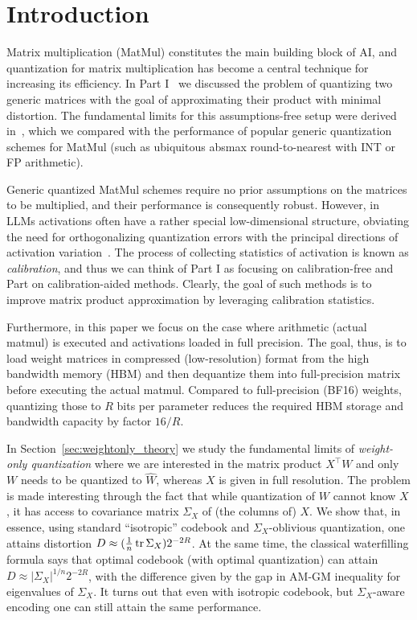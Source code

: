 \documentclass[journal]{IEEEtran}
\newcommand{\trace}{\mathop{\mathrm{tr}}}
\def\tr{\trace}
\begin{document}
\section{Introduction}

Matrix multiplication (MatMul) constitutes the main building block of
AI, and quantization for matrix multiplication has become a central technique for increasing its
efficiency. In Part I~\cite{OP26part1} we discussed the problem of quantizing two generic matrices
with the goal of approximating their product with minimal distortion. The fundamental limits for
this assumptions-free setup were derived in~\cite{ordentlich2024optimal}, which we compared with
the performance of popular generic quantization schemes for MatMul (such as ubiquitous absmax
round-to-nearest with INT or FP arithmetic).

Generic quantized MatMul schemes require no prior assumptions on the matrices to be multiplied,
and their performance is consequently robust. However, in LLMs activations often have a rather
special low-dimensional structure, obviating the need for orthogonalizing quantization errors with
the principal directions of activation variation~\cite{adaround,frantar2023optq}. The process of
collecting statistics of activation is known as \emph{calibration}, and thus we can think of Part
I as focusing on calibration-free and Part on calibration-aided methods. Clearly, the goal of such
methods is to improve matrix product approximation by leveraging calibration statistics.

Furthermore, in this paper we focus on the case where arithmetic (actual matmul) is executed and
activations loaded in
full precision. The goal, thus, is to load weight matrices in compressed (low-resolution) format
from the high bandwidth memory (HBM) and then dequantize them into full-precision matrix before
executing the actual matmul. 
Compared to full-precision (BF16) weights, quantizing those to $R$ bits per parameter reduces the required HBM storage and
bandwidth capacity by factor
$16/R$. %


In Section~\ref{sec:weightonly_theory} we study the fundamental limits of \emph{weight-only quantization} where we are interested in the
matrix product $X^\top W$ and only $W$ needs to be quantized to $\hat{W}$, whereas $X$ is given
in full resolution. The problem is made interesting through the fact that while quantization of
$W$ cannot know $X$, it has access to covariance matrix $\Sigma_X$ of (the columns of) $X$.
We show that, in essence, using standard ``isotropic'' codebook and $\Sigma_X$-oblivious
quantization, one attains distortion $D\approx
({1\over n} \tr \Sigma_X) 2^{-2R}$. At the same time, the classical waterfilling
formula says that optimal codebook (with optimal quantization) can attain $D\approx
 |\Sigma_X|^{1/n} 2^{-2R}$, with the difference given by the gap in AM-GM inequality for
eigenvalues of $\Sigma_X$. It turns out that even with isotropic codebook, but $\Sigma_X$-aware
encoding one can still attain the same performance.
\end{document}
